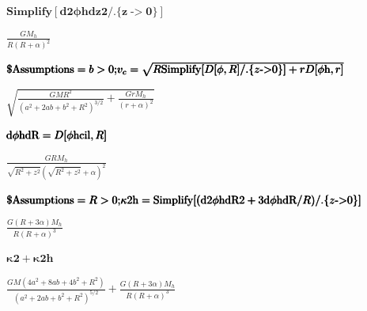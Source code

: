 \documentclass{article}
\begin{document}
\begin{doublespace}
\noindent\(\pmb{\text{Simplify}[\text{d2$\phi $hdz2}\text{/.}\{z\text{-$>$}0\}]}\)
\end{doublespace}

\begin{doublespace}
\noindent\(\frac{G M_h}{R (R+\alpha )^2}\)
\end{doublespace}

\begin{doublespace}
\noindent\(\pmb{\text{$\$$Assumptions} = b>0;}\\
\pmb{v_c=\sqrt{R \text{Simplify}[D[\phi ,R]\text{/.}\{z\text{-$>$}0\}]+r D[\text{$\phi $h},r]}}\)
\end{doublespace}

\begin{doublespace}
\noindent\(\sqrt{\frac{G M R^2}{\left(a^2+2 a b+b^2+R^2\right)^{3/2}}+\frac{G r M_h}{(r+\alpha )^2}}\)
\end{doublespace}

\begin{doublespace}
\noindent\(\pmb{\text{}}\\
\pmb{\text{d$\phi $hdR} = D[\text{$\phi $hcil},R]}\)
\end{doublespace}

\begin{doublespace}
\noindent\(\frac{G R M_h}{\sqrt{R^2+z^2} \left(\sqrt{R^2+z^2}+\alpha \right)^2}\)
\end{doublespace}

\begin{doublespace}
\noindent\(\pmb{\text{$\$$Assumptions} = R>0;}\\
\pmb{\text{$\kappa $2h} = \text{Simplify}[(\text{d2$\phi $hdR2}+3 \text{d$\phi $hdR}/R)\text{/.}\{z\text{-$>$}0\}]}\)
\end{doublespace}

\begin{doublespace}
\noindent\(\frac{G (R+3 \alpha ) M_h}{R (R+\alpha )^3}\)
\end{doublespace}

\begin{doublespace}
\noindent\(\pmb{\text{$\kappa $2}+\text{$\kappa $2h}}\)
\end{doublespace}

\begin{doublespace}
\noindent\(\frac{G M \left(4 a^2+8 a b+4 b^2+R^2\right)}{\left(a^2+2 a b+b^2+R^2\right)^{5/2}}+\frac{G (R+3 \alpha ) M_h}{R (R+\alpha )^3}\)
\end{doublespace}
\end{document}
